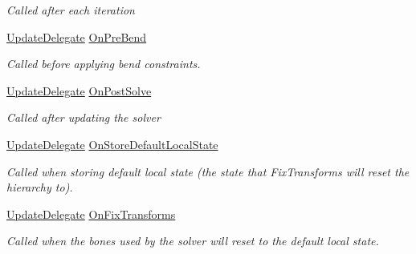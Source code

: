 \begin{DoxyCompactItemize}
\begin{DoxyCompactList}\small\item\em Called after each iteration \end{DoxyCompactList}\item 
\mbox{\hyperlink{class_root_motion_1_1_final_i_k_1_1_i_k_solver_a237d83c7b9c6eace8a21aa5821f0a671}{Update\+Delegate}} \mbox{\hyperlink{class_root_motion_1_1_final_i_k_1_1_i_k_solver_full_body_a50640623e84028aabf5f3cfba7064f07}{On\+Pre\+Bend}}
\begin{DoxyCompactList}\small\item\em Called before applying bend constraints. \end{DoxyCompactList}\item 
\mbox{\hyperlink{class_root_motion_1_1_final_i_k_1_1_i_k_solver_a237d83c7b9c6eace8a21aa5821f0a671}{Update\+Delegate}} \mbox{\hyperlink{class_root_motion_1_1_final_i_k_1_1_i_k_solver_full_body_a454e350cb298682928252077e83fd4f5}{On\+Post\+Solve}}
\begin{DoxyCompactList}\small\item\em Called after updating the solver \end{DoxyCompactList}\item 
\mbox{\hyperlink{class_root_motion_1_1_final_i_k_1_1_i_k_solver_a237d83c7b9c6eace8a21aa5821f0a671}{Update\+Delegate}} \mbox{\hyperlink{class_root_motion_1_1_final_i_k_1_1_i_k_solver_full_body_ac8f915abe3bcc14230e556566904a04c}{On\+Store\+Default\+Local\+State}}
\begin{DoxyCompactList}\small\item\em Called when storing default local state (the state that Fix\+Transforms will reset the hierarchy to). \end{DoxyCompactList}\item 
\mbox{\hyperlink{class_root_motion_1_1_final_i_k_1_1_i_k_solver_a237d83c7b9c6eace8a21aa5821f0a671}{Update\+Delegate}} \mbox{\hyperlink{class_root_motion_1_1_final_i_k_1_1_i_k_solver_full_body_aea393686f485cd8fed883cb6f757a1e7}{On\+Fix\+Transforms}}
\begin{DoxyCompactList}\small\item\em Called when the bones used by the solver will reset to the default local state. \end{DoxyCompactList}\end{DoxyCompactItemize}
